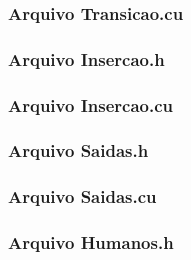\newpage

\subsubsection{Arquivo Transicao.cu}



\newpage

\subsubsection{Arquivo Insercao.h}



\newpage

\subsubsection{Arquivo Insercao.cu}



\newpage

\subsubsection{Arquivo Saidas.h}



\newpage

\subsubsection{Arquivo Saidas.cu}



\newpage

\subsubsection{Arquivo Humanos.h}



